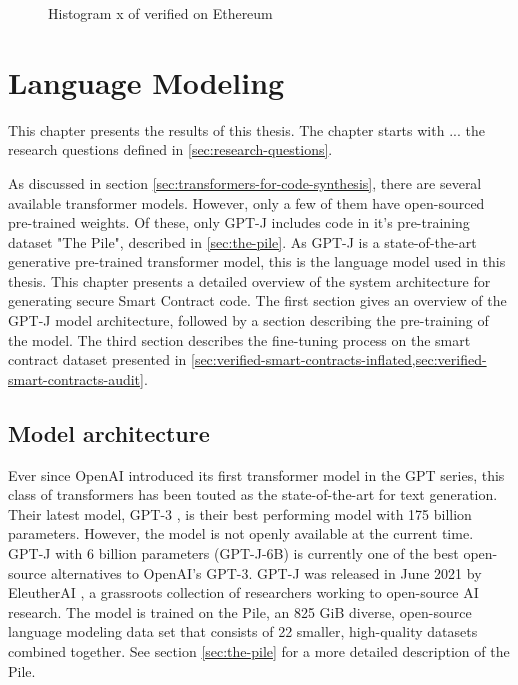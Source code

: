 \begin{figure}[ht]
    \centering
    
    \caption{Histogram \small x of verified  on Ethereum}
\end{figure}









\section{Language Modeling}
\label{sec:language-modeling}
This chapter presents the results of this thesis. The chapter starts with ... the research questions defined in \cref{sec:research-questions}.

As discussed in section \cref{sec:transformers-for-code-synthesis}, there are several available transformer models. However, only a few of them have open-sourced pre-trained weights. Of these, only GPT-J \cite{gpt-j} includes code in it's pre-training dataset "The Pile", described in \cref{sec:the-pile}. As GPT-J is a state-of-the-art generative pre-trained transformer model, this is the language model used in this thesis. This chapter presents a detailed overview of the system architecture for generating secure Smart Contract code. The first section gives an overview of the GPT-J model architecture, followed by a section describing the pre-training of the model. The third section describes the fine-tuning process on the smart contract dataset presented in \cref{sec:verified-smart-contracts-inflated,sec:verified-smart-contracts-audit}. 


\subsection{Model architecture}
\label{sec:architecture}
Ever since OpenAI introduced its first transformer model in the GPT series, this class of transformers has been touted as the state-of-the-art for text generation. Their latest model, GPT-3 \cite{brown2020language}, is their best performing model with 175 billion parameters. However, the model is not openly available at the current time. GPT-J \cite{gpt-j} with 6 billion parameters (GPT-J-6B) is currently one of the best open-source alternatives to OpenAI's GPT-3. GPT-J was released in June 2021 by EleutherAI \cite{elutherai}, a grassroots collection of researchers working to open-source AI research. The model is trained on the Pile, an 825 GiB diverse, open-source language modeling data set that consists of 22 smaller, high-quality datasets combined together. See section \cref{sec:the-pile} for a more detailed description of the Pile.

